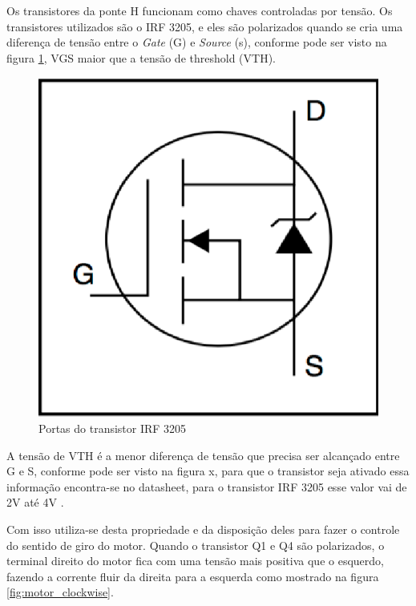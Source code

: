 Os transistores da ponte H funcionam como chaves controladas por tensão. Os transistores utilizados são o IRF 3205, e eles são polarizados quando se cria uma diferença de tensão entre o \textit{Gate} (G) e \textit{Source} (s), conforme pode ser visto na figura \ref{fig:portas_transistor_irf}, VGS maior que a tensão de threshold (VTH).

\begin{figure}[!htb]
	\centering
	\includegraphics[keepaspectratio=true,scale=0.8]{figuras/referencialteorico/portas_irf_3205}
	\caption{Portas do transistor IRF 3205 \cite{datasheet_irf_3205}}
	\label{fig:portas_transistor_irf}
\end{figure}

A tensão de VTH é a menor diferença de tensão que precisa ser alcançado entre G e S, conforme pode ser visto na figura x, para que o transistor seja ativado essa informação encontra-se no datasheet, para o transistor IRF 3205 esse valor vai de 2V até 4V \cite{datasheet_irf_3205}.

Com isso utiliza-se desta propriedade e da disposição deles para fazer o controle do sentido de giro do motor. Quando o transistor Q1 e Q4 são polarizados, o terminal direito do motor fica com uma tensão mais positiva que o esquerdo, fazendo a corrente fluir da direita para a esquerda como mostrado na figura \ref{fig:motor_clockwise}.

